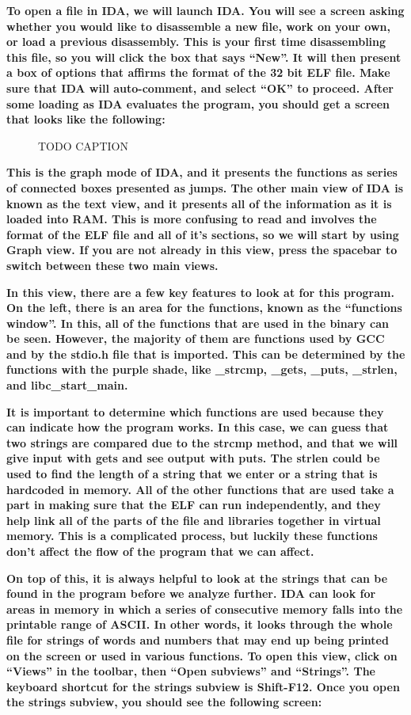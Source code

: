 \documentclass[letterpaper]{article}
\newcommand{\sitfig}[3]{
\begin{figure}[H]
\centering
\makebox[\textwidth][c]{
#2
}
\caption{#3}
\label{#1}
\end{figure}
}
\newcommand{\sitgfx}[4][scale=1.0]{
\sitfig{#3}{\texttt{[image: \#2]}}{#4}
}
\begin{document}
\textbf{To open a file in IDA, we will launch IDA. You will see a screen asking whether you would like to disassemble a
new file, work on your own, or load a previous disassembly. This is your first time disassembling this file, so you
will click the box that says ``New''. It will then present a box of options that affirms the format of the 32 bit ELF
file. Make sure that IDA will auto-comment, and select ``OK'' to proceed. After some loading as IDA evaluates the
program, you should get a screen that looks like the following:}

  
\sitgfx[width=6.5in,height=4.0626in]{FINALWORKINGDOCFORMERLYPRECURSOR-img045.png}{fig:unk}{TODO CAPTION}
 \textbf{This is the graph mode of IDA, and it presents the functions as series of connected boxes presented as jumps.
The other main view of IDA is known as the text view, and it presents all of the information as it is loaded into RAM.
This is more confusing to read and involves the format of the ELF file and all of it's sections, so we will start by
using Graph view. If you are not already in this view, press the spacebar to switch between these two main views.}

\textbf{In this view, there are a few key features to look at for this program. On the left, there is an area for the
functions, known as the ``functions window''. In this, all of the functions that are used in the binary can be seen.
However, the majority of them are functions used by GCC and by the stdio.h file that is imported. This can be
determined by the functions with the purple shade, like \_strcmp, \_gets, \_puts, \_strlen, and libc\_start\_main.}

\textbf{It is important to determine which functions are used because they can indicate how the program works. In this
case, we can guess that two strings are compared due to the strcmp method, and that we will give input with gets and
see output with puts. The strlen could be used to find the length of a string that we enter or a string that is
hardcoded in memory. All of the other functions that are used take a part in making sure that the ELF can run
independently, and they help link all of the parts of the file and libraries together in virtual memory. This is a
complicated process, but luckily these functions don't affect the flow of the program that we can affect.}

\textbf{On top of this, it is always helpful to look at the strings that can be found in the program before we analyze
further. IDA can look for areas in memory in which a series of consecutive memory falls into the printable range of
ASCII. In other words, it looks through the whole file for strings of words and numbers that may end up being printed
on the screen or used in various functions. To open this view, click on ``Views'' in the toolbar, then ``Open
subviews'' and ``Strings''. The keyboard shortcut for the strings subview is Shift-F12. Once you open the strings
subview, you should see the following screen:}
\end{document}
